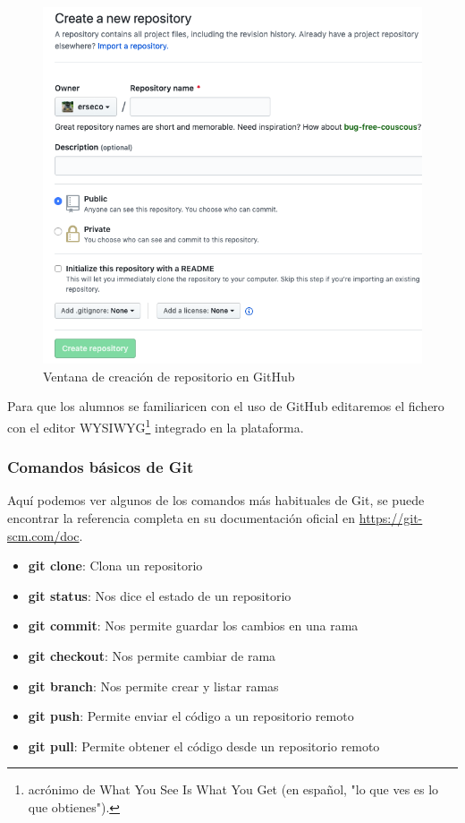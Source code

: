 \begin{figure}[H]
\centering
\includegraphics[width=1.0\textwidth]{../images/git2}
\caption{Ventana de creación de repositorio en GitHub}
\label{fig:git2}
\end{figure}

Para que los alumnos se familiaricen con el uso de GitHub editaremos el fichero  con el editor WYSIWYG\footnote{acrónimo de What You See Is What You Get (en español, "lo que ves es lo que obtienes").} integrado en la plataforma.

\subsubsection{Comandos básicos de Git}

Aquí podemos ver algunos de los comandos más habituales de Git, se puede encontrar la referencia completa en su documentación oficial en \url{https://git-scm.com/doc}.

\begin{itemize}
  \item \textbf{git clone}: Clona un repositorio
  \item \textbf{git status}: Nos dice el estado de un repositorio
  \item \textbf{git commit}: Nos permite guardar los cambios en una rama
  \item \textbf{git checkout}: Nos permite cambiar de rama
  \item \textbf{git branch}: Nos permite crear y listar ramas
  \item \textbf{git push}: Permite enviar el código a un repositorio remoto
  \item \textbf{git pull}: Permite obtener el código desde un repositorio remoto
\end{itemize}

